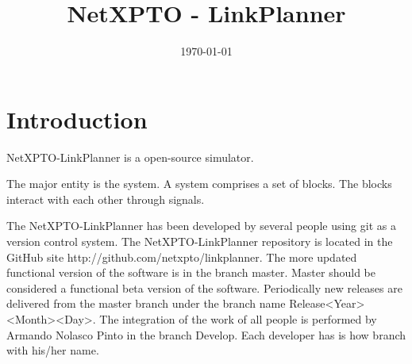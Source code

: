 \title{NetXPTO - LinkPlanner}
\author{}
\date{\today}
\maketitle

\tableofcontents

\chapter*{Introduction}

NetXPTO-LinkPlanner is a open-source simulator.

The major entity is the system.
A system comprises a set of blocks.
The blocks interact with each other through signals.

The NetXPTO-LinkPlanner has been developed by several people using git as a version control system.
The NetXPTO-LinkPlanner repository is located in the GitHub site http://github.com/netxpto/linkplanner.
The more updated functional version of the software is in the branch master.
Master should be considered a functional beta version of the software.
Periodically new releases are delivered from the master branch under the branch name Release<Year><Month><Day>.
The integration of the work of all people is performed by Armando Nolasco Pinto in the branch Develop.
Each developer has is how branch with his/her name.





